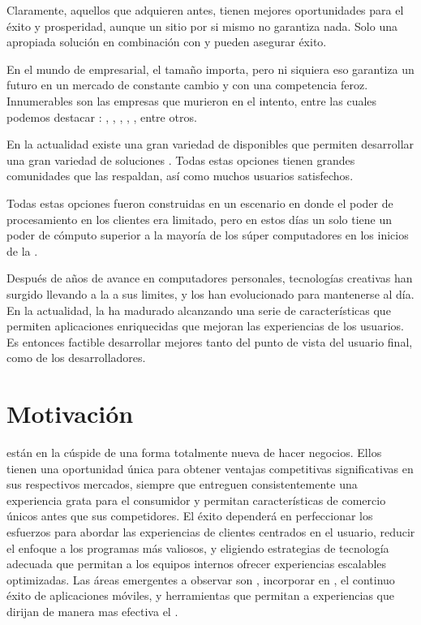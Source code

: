 Claramente, aquellos que adquieren \estores antes, tienen mejores oportunidades  para el éxito y prosperidad, aunque un sitio \ecommerce por si mismo no garantiza nada. Solo una apropiada solución \ecommerce en combinación con \emarketing y \advertising pueden asegurar éxito.


En el mundo de empresarial, el tamaño importa, pero ni siquiera eso garantiza un futuro en un mercado de constante cambio y con una competencia feroz. Innumerables son las empresas que murieron en el intento, entre las cuales podemos destacar : \sega, \kodak, \daewoo, \nokia, \blockbuster, entre otros.

En la actualidad existe una gran variedad de \frameworks \opensource disponibles que permiten desarrollar una gran variedad de soluciones \ecommerce. Todas estas opciones tienen grandes comunidades que las respaldan, así como muchos usuarios satisfechos. 

Todas estas opciones fueron construidas en un escenario en donde el poder de procesamiento en los clientes era limitado, pero en estos días un solo \iphone tiene un poder de cómputo superior a la mayoría de los súper computadores en los inicios de la \web. 

Después de años de avance en computadores personales, tecnologías creativas han surgido llevando a la \web a sus limites, y los \web \browsers han evolucionado para mantenerse al día. En la actualidad, la \web ha madurado alcanzando una serie de características que permiten aplicaciones enriquecidas que mejoran las experiencias de los usuarios. Es entonces factible desarrollar \frameworks \ecommerce mejores tanto del punto de vista del usuario final, como de los desarrolladores. 


\section{Motivación}\label{cap:intro:motivacion}

\online \retailers están en la cúspide de una forma totalmente nueva de hacer negocios. Ellos tienen una oportunidad única para obtener ventajas competitivas significativas en sus respectivos mercados, siempre que entreguen consistentemente una experiencia grata para el consumidor y permitan características de comercio \multichannel únicos antes que sus competidores. El éxito dependerá en perfeccionar los esfuerzos para abordar las experiencias de clientes centrados en el usuario, reducir el enfoque a los programas más valiosos, y eligiendo estrategias de tecnología adecuada que permitan a los equipos internos ofrecer experiencias escalables optimizadas. Las áreas emergentes a observar son \realtime \retail \analytics, incorporar \socialnetwork en \ecommerce, el continuo éxito de aplicaciones móviles, y herramientas que permitan a \retailers \scale experiencias que dirijan de manera mas efectiva el \merchandising.

